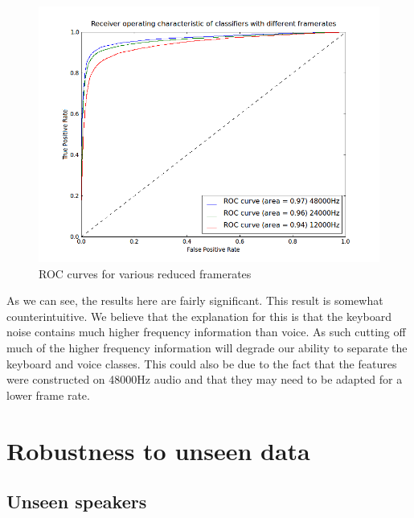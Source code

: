 \documentclass[ %
                    author={Sam Phippen},
                supervisor={Dr. Rafal Bogacz},
                     title={Real time voice activity detectors in noisy personal computing environments},
                  subtitle={},
                    degree={MEng},
                      year={2012} ]{thesis}
\begin{document}
\begin{figure}
    \includegraphics[width=15cm]{roc_framerates.png}
    \caption{ROC curves for various reduced framerates}
    \label{fig:roc-frameratecrush}
\end{figure}

As we can see, the results here are fairly significant. This result is somewhat
counterintuitive. We believe that the explanation for this is that the keyboard
noise contains much higher frequency information than voice. As such cutting
off much of the higher frequency information will degrade our ability to
separate the keyboard and voice classes. This could also be due to the fact
that the features were constructed on 48000Hz audio and that they may need to
be adapted for a lower frame rate.

\section {Robustness to unseen data}

\subsection{Unseen speakers}
\end{document}
